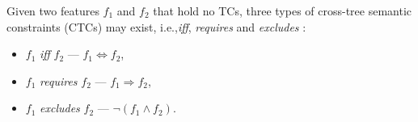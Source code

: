 Given two features $f_1$ and $f_2$ that hold no TCs, three types of cross-tree semantic constraints  (CTCs) may exist, i.e.,\emph{iff}, \emph{requires} and \emph{excludes} \cite{DBLP:conf/splc/Batory05}:
 
\begin{itemize}[itemindent=*]
\item $f_1$ \emph{iff} $f_2$ --- $f_1 \Leftrightarrow f_2$,
\item $f_1$ \emph{requires} $f_2$ --- $f_1 \Rightarrow f_2$,
\item $f_1$ \emph{excludes} $f_2$ --- $\neg(f_1 \wedge f_2)$.
\end{itemize}

%
%
%
%
%


